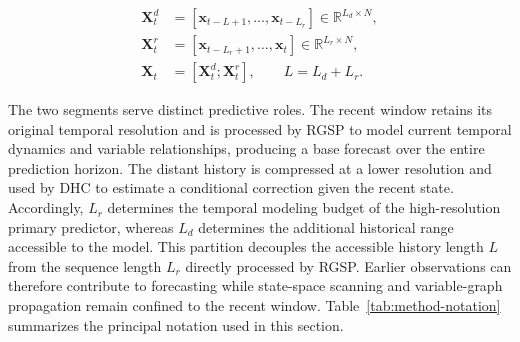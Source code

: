 \begin{equation}
\begin{aligned}
\mathbf{X}^{d}_{t}
&=[\mathbf{x}_{t-L+1},\ldots,\mathbf{x}_{t-L_r}]
\in\mathbb{R}^{L_d\times N},\\
\mathbf{X}^{r}_{t}
&=[\mathbf{x}_{t-L_r+1},\ldots,\mathbf{x}_{t}]
\in\mathbb{R}^{L_r\times N},\\
\mathbf{X}_{t}&=[\mathbf{X}^{d}_{t};\mathbf{X}^{r}_{t}],
\qquad L=L_d+L_r.
\end{aligned}
\label{eq:history-partition}
\end{equation}

The two segments serve distinct predictive roles. The recent window retains its original temporal resolution and is processed by RGSP to model current temporal dynamics and variable relationships, producing a base forecast over the entire prediction horizon. The distant history is compressed at a lower resolution and used by DHC to estimate a conditional correction given the recent state. Accordingly, \(L_r\) determines the temporal modeling budget of the high-resolution primary predictor, whereas \(L_d\) determines the additional historical range accessible to the model. This partition decouples the accessible history length \(L\) from the sequence length \(L_r\) directly processed by RGSP. Earlier observations can therefore contribute to forecasting while state-space scanning and variable-graph propagation remain confined to the recent window. Table~\ref{tab:method-notation} summarizes the principal notation used in this section.

